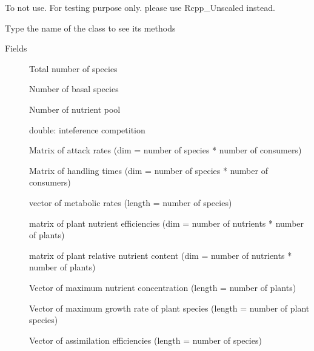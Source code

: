 \documentclass[letterpaper]{book}
\begin{document}
%
\begin{Description}\relax
To not use. For testing purpose only. please use Rcpp\_Unscaled instead.
\end{Description}
%
\begin{Description}\relax
Type the name of the class to see its methods
\end{Description}
%
\begin{Section}{Fields}

\begin{description}

\item[] Total number of species

\item[] Number of basal species

\item[] Number of nutrient pool

\item[] double: inteference competition

\item[] Matrix of attack rates (dim = number of species * number of consumers)

\item[] Matrix of handling times (dim = number of species * number of consumers)

\item[] vector of metabolic rates (length = number of species)

\item[] matrix of plant nutrient efficiencies (dim = number of nutrients * number of plants)

\item[] matrix of plant relative nutrient content (dim = number of nutrients * number of plants)

\item[] Vector of maximum nutrient concentration (length = number of plants)

\item[] Vector of maximum growth rate of plant species (length = number of plant species)

\item[] Vector of assimilation efficiencies (length = number of species)


\end{description}
\end{Section}
\end{document}
